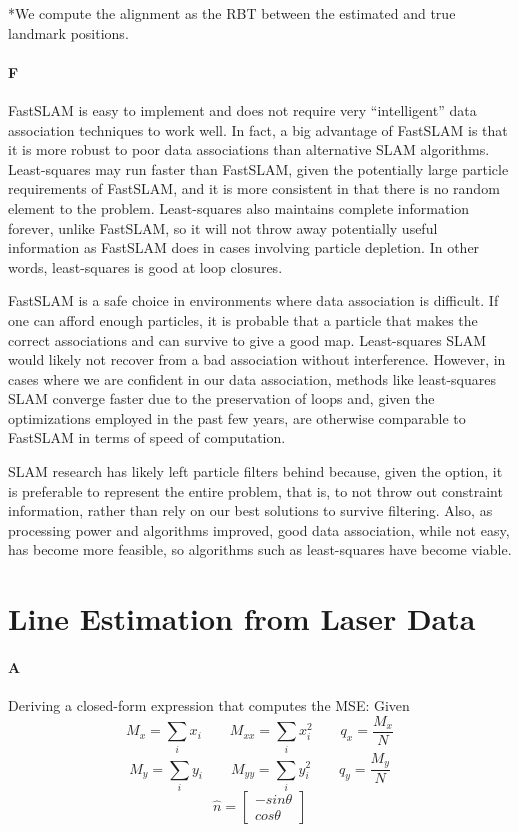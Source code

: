 \documentclass[12pt]{article}
\begin{document}
*We compute the alignment as the RBT between the estimated and true landmark positions.

\paragraph{F}
FastSLAM is easy to implement and does not require very ``intelligent'' data
association techniques to work well. In fact, a big advantage of FastSLAM is
that it is more robust to poor data associations than alternative SLAM
algorithms. Least-squares may run faster than FastSLAM, given the potentially
large particle requirements of FastSLAM, and it is more consistent in that
there is no random element to the problem. Least-squares also maintains
complete information forever, unlike FastSLAM, so it will not throw away
potentially useful information as FastSLAM does in cases involving particle
depletion. In other words, least-squares is good at loop closures.

FastSLAM is a safe choice in environments where data association is difficult.
If one can afford enough particles, it is probable that a particle that makes
the correct associations and can survive to give a good map. Least-squares SLAM
would likely not recover from a bad association without interference. However,
in cases where we are confident in our data association, methods like
least-squares SLAM converge faster due to the preservation of loops and, given
the optimizations employed in the past few years, are otherwise comparable to
FastSLAM in terms of speed of computation.

SLAM research has likely left particle filters behind because, given the option,
it is preferable to represent the entire problem, that is, to not throw out
constraint information, rather than rely on our best solutions to survive
filtering. Also, as processing power and algorithms improved, good data association,
while not easy, has become more feasible, so algorithms such as least-squares
have become viable.

\section{Line Estimation from Laser Data}

\paragraph{A}Deriving a closed-form expression that computes the MSE:
Given
$$M_x = \displaystyle\sum_i x_i \qquad M_{xx} = \displaystyle\sum_i x_i^2 \qquad q_x = \frac{M_x}{N}$$
$$M_y = \displaystyle\sum_i y_i \qquad M_{yy} = \displaystyle\sum_i y_i^2 \qquad q_y = \frac{M_y}{N}$$
 $$\hat{n} = \left[ \begin{array}{c}
-sin\theta \\
cos\theta
\end{array}\right]$$
\end{document}
